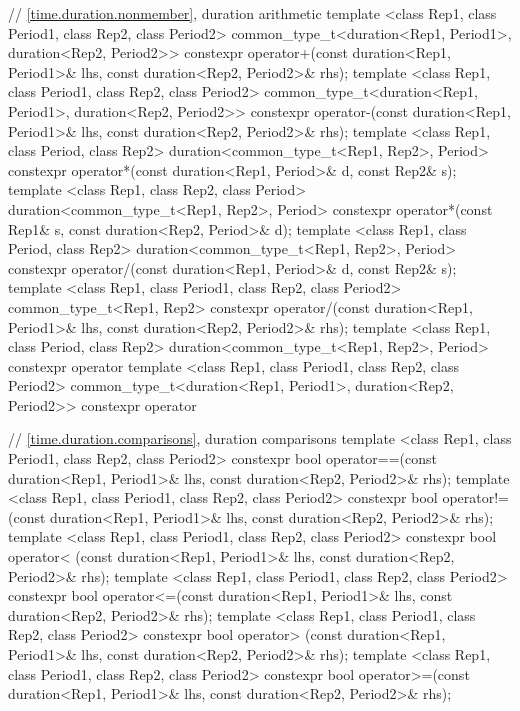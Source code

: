 \begin{codeblock}
{{// \ref{time.duration.nonmember}, duration arithmetic
template <class Rep1, class Period1, class Rep2, class Period2>
  common_type_t<duration<Rep1, Period1>, duration<Rep2, Period2>>
  constexpr operator+(const duration<Rep1, Period1>& lhs, const duration<Rep2, Period2>& rhs);
template <class Rep1, class Period1, class Rep2, class Period2>
  common_type_t<duration<Rep1, Period1>, duration<Rep2, Period2>>
  constexpr operator-(const duration<Rep1, Period1>& lhs, const duration<Rep2, Period2>& rhs);
template <class Rep1, class Period, class Rep2>
  duration<common_type_t<Rep1, Rep2>, Period>
  constexpr operator*(const duration<Rep1, Period>& d, const Rep2& s);
template <class Rep1, class Rep2, class Period>
  duration<common_type_t<Rep1, Rep2>, Period>
  constexpr operator*(const Rep1& s, const duration<Rep2, Period>& d);
template <class Rep1, class Period, class Rep2>
  duration<common_type_t<Rep1, Rep2>, Period>
  constexpr operator/(const duration<Rep1, Period>& d, const Rep2& s);
template <class Rep1, class Period1, class Rep2, class Period2>
  common_type_t<Rep1, Rep2>
  constexpr operator/(const duration<Rep1, Period1>& lhs, const duration<Rep2, Period2>& rhs);
template <class Rep1, class Period, class Rep2>
  duration<common_type_t<Rep1, Rep2>, Period>
  constexpr operator%
template <class Rep1, class Period1, class Rep2, class Period2>
  common_type_t<duration<Rep1, Period1>, duration<Rep2, Period2>>
  constexpr operator%

// \ref{time.duration.comparisons}, duration comparisons
template <class Rep1, class Period1, class Rep2, class Period2>
  constexpr bool operator==(const duration<Rep1, Period1>& lhs,
                            const duration<Rep2, Period2>& rhs);
template <class Rep1, class Period1, class Rep2, class Period2>
  constexpr bool operator!=(const duration<Rep1, Period1>& lhs,
                            const duration<Rep2, Period2>& rhs);
template <class Rep1, class Period1, class Rep2, class Period2>
  constexpr bool operator< (const duration<Rep1, Period1>& lhs,
                            const duration<Rep2, Period2>& rhs);
template <class Rep1, class Period1, class Rep2, class Period2>
  constexpr bool operator<=(const duration<Rep1, Period1>& lhs,
                            const duration<Rep2, Period2>& rhs);
template <class Rep1, class Period1, class Rep2, class Period2>
  constexpr bool operator> (const duration<Rep1, Period1>& lhs,
                            const duration<Rep2, Period2>& rhs);
template <class Rep1, class Period1, class Rep2, class Period2>
  constexpr bool operator>=(const duration<Rep1, Period1>& lhs,
                            const duration<Rep2, Period2>& rhs);

}}
\end{codeblock}
